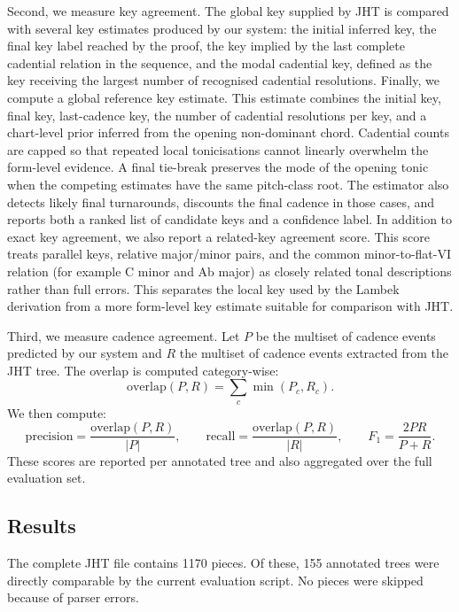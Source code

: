 Second, we measure key agreement. The global key supplied by JHT is compared
with several key estimates produced by our system: the initial inferred key,
the final key label reached by the proof, the key implied by the last complete
cadential relation in the sequence, and the modal cadential key, defined as the
key receiving the largest number of recognised cadential resolutions. Finally,
we compute a global reference key estimate. This estimate combines the initial
key, final key, last-cadence key, the number of cadential resolutions per key,
and a chart-level prior inferred from the opening non-dominant chord. Cadential
counts are capped so that repeated local tonicisations cannot linearly
overwhelm the form-level evidence. A final tie-break preserves the mode of the
opening tonic when the competing estimates have the same pitch-class root.
The estimator also detects likely final turnarounds, discounts the final
cadence in those cases, and reports both a ranked list of candidate keys and a
confidence label. In addition to exact key agreement, we also report a
related-key agreement score. This score treats parallel keys, relative
major/minor pairs, and the common minor-to-flat-VI relation (for example
C minor and Ab major) as closely related tonal descriptions rather than full
errors. This separates the local key used by the Lambek derivation from a more
form-level key estimate suitable for comparison with JHT.

Third, we measure cadence agreement. Let $P$ be the multiset of cadence events
predicted by our system and $R$ the multiset of cadence events extracted from
the JHT tree. The overlap is computed category-wise:
\[
\mathrm{overlap}(P,R) = \sum_{c} \min(P_c, R_c).
\]
We then compute:
\[
\mathrm{precision} = \frac{\mathrm{overlap}(P,R)}{|P|},
\qquad
\mathrm{recall} = \frac{\mathrm{overlap}(P,R)}{|R|},
\qquad
F_1 = \frac{2PR}{P+R}.
\]
These scores are reported per annotated tree and also aggregated over the full
evaluation set.

\subsection{Results}

The complete JHT file contains 1170 pieces. Of these, 155 annotated trees were
directly comparable by the current evaluation script. No pieces were skipped
because of parser errors.

